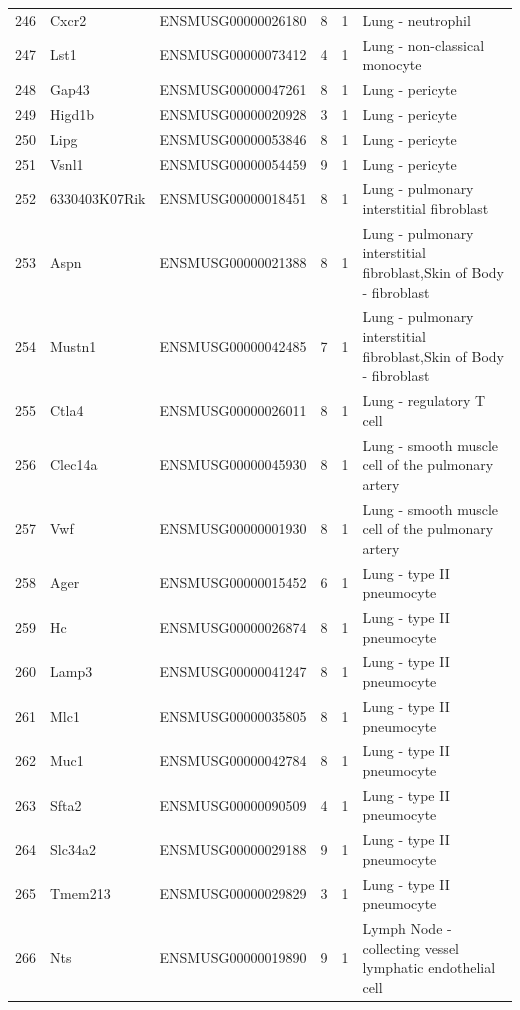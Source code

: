 \begin{table}[ht]
{\begin{tabular}{lllrrl}
        246 & Cxcr2 & ENSMUSG00000026180 & 8 & 1 & Lung - neutrophil \\
        247 & Lst1 & ENSMUSG00000073412 & 4 & 1 & Lung - non-classical monocyte \\
        248 & Gap43 & ENSMUSG00000047261 & 8 & 1 & Lung - pericyte \\
        249 & Higd1b & ENSMUSG00000020928 & 3 & 1 & Lung - pericyte \\
        250 & Lipg & ENSMUSG00000053846 & 8 & 1 & Lung - pericyte \\
        251 & Vsnl1 & ENSMUSG00000054459 & 9 & 1 & Lung - pericyte \\
        252 & 6330403K07Rik & ENSMUSG00000018451 & 8 & 1 & Lung - pulmonary interstitial fibroblast \\
        253 & Aspn & ENSMUSG00000021388 & 8 & 1 & Lung - pulmonary interstitial fibroblast,Skin of Body - fibroblast \\
        254 & Mustn1 & ENSMUSG00000042485 & 7 & 1 & Lung - pulmonary interstitial fibroblast,Skin of Body - fibroblast \\
        255 & Ctla4 & ENSMUSG00000026011 & 8 & 1 & Lung - regulatory T cell \\
        256 & Clec14a & ENSMUSG00000045930 & 8 & 1 & Lung - smooth muscle cell of the pulmonary artery \\
        257 & Vwf & ENSMUSG00000001930 & 8 & 1 & Lung - smooth muscle cell of the pulmonary artery \\
        258 & Ager & ENSMUSG00000015452 & 6 & 1 & Lung - type II pneumocyte \\
        259 & Hc & ENSMUSG00000026874 & 8 & 1 & Lung - type II pneumocyte \\
        260 & Lamp3 & ENSMUSG00000041247 & 8 & 1 & Lung - type II pneumocyte \\
        261 & Mlc1 & ENSMUSG00000035805 & 8 & 1 & Lung - type II pneumocyte \\
        262 & Muc1 & ENSMUSG00000042784 & 8 & 1 & Lung - type II pneumocyte \\
        263 & Sfta2 & ENSMUSG00000090509 & 4 & 1 & Lung - type II pneumocyte \\
        264 & Slc34a2 & ENSMUSG00000029188 & 9 & 1 & Lung - type II pneumocyte \\
        265 & Tmem213 & ENSMUSG00000029829 & 3 & 1 & Lung - type II pneumocyte \\
        266 & Nts & ENSMUSG00000019890 & 9 & 1 & Lymph Node - collecting vessel lymphatic endothelial cell \\

\end{tabular}}
\end{table}

